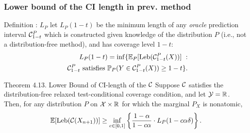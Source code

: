 \documentclass[compress]{beamer}
\begin{document}
\begin{frame}\frametitle{Lower bound of the CI length in prev. method}
	\begin{block}{Definition : $L_P$}
		\small let $L_P(1-t)$ be the minimum length of any \emph{oracle} prediction interval  $\mathcal{C}^P_{1-t}$ which is constructed given knowledge of the distribution $P$ (i.e., not a distribution-free method), and has coverage level $1-t$:
		\begin{align*}\label{eqn:L_P_def}L_P(1-t) = \inf\{ \mathbb{E}_P[\textnormal{Leb}(\mathcal{C}^P_{1-t}(X))] \ : \\
			\textnormal{ $\mathcal{C}^P_{1-t}$ satisfies }\mathbb{P}_P(Y\in \mathcal{C}^P_{1-t}(X))\geq 1-t\}.\end{align*}
	\end{block}

	\begin{block}{Theorem 4.13. Lower Bound of CI-length of the $\mathcal{C}$}
		Suppose $\mathcal{C}$ satisfies the distribution-free relaxed test-conditional coverage condition, and let $\mathcal{Y}=\mathbb{R}$. Then, for any distribution $P$ on $\mathcal{X}\times\mathbb{R}$ for which the marginal $P_X$ is nonatomic,
		\small\[\mathbb{E}[\textnormal{Leb}(\mathcal{C}(X_{n+1}))] \geq \inf_{c\in[0,1]} \left\{\frac{1-\alpha}{1-c\alpha} \cdot L_P(1-c\alpha\delta)\right\}.\] 
	\end{block}
\end{frame}
\end{document}

